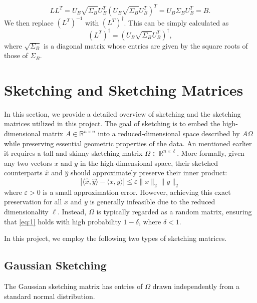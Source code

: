 \documentclass[a4paper, 12pt,oneside]{article}
\begin{document}
	\[
	LL^T = U_B \sqrt{\Sigma_B} U_B^T (U_B \sqrt{\Sigma_B} U_B^T)^T = U_B \Sigma_B U_B^T = B.
	\]
	We then replace $(L^T)^{-1}$ with $(L^T)^\dagger$. This can be simply calculated as
	\[
	(L^T)^\dagger = (U_B \sqrt{\Sigma_B} U_B^T)^\dagger,
	\]
	where $\sqrt{\Sigma_B}$ is a diagonal matrix whose entries are given by the square roots of those of $\Sigma_B$.
	\section{Sketching and Sketching Matrices}

	In this section, we provide a detailed overview of sketching and the sketching matrices utilized in this project. The goal of sketching is to embed the high-dimensional matrix $A \in \mathbb{R}^{n \times n}$ into a reduced-dimensional space described by $A\Omega$ while preserving essential geometric properties of the data. An mentioned earlier it requires a tall and skinny sketching matrix $\Omega \in \mathbb{R}^{n \times \ell}$. 
	More formally, given any two vectors $x$ and $y$ in the high-dimensional space, their sketched counterparts $\hat{x}$ and $\hat{y}$ should approximately preserve their inner product:
	\begin{equation}\label{eq:1}
	\left| \langle \hat{x}, \hat{y} \rangle - \langle x, y \rangle \right| \leq \varepsilon \|x\|_2 \|y\|_2 \tag{2}
	\end{equation}
	where $\varepsilon > 0$ is a small approximation error. However, achieving this exact preservation for all $x$ and $y$ is generally infeasible due to the reduced dimensionality $\ell$. Instead, $\Omega$ is typically regarded as a random matrix, ensuring that \cref{eq:1} holds with high probability $1 - \delta$, where $\delta < 1$.

	In this project, we employ the following two types of sketching matrices.
	\subsection{Gaussian Sketching }
	The Gaussian sketching matrix has entries of $\Omega$ drawn independently from a standard normal distribution.
\end{document}
